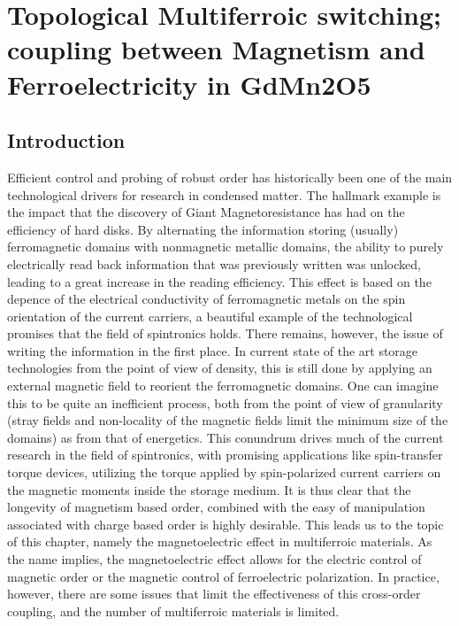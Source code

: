 \chapter{Topological Multiferroic switching; coupling between Magnetism and Ferroelectricity in GdMn2O5}
\section{Introduction}
Efficient control and probing of robust order has historically been one of the main technological drivers for research in condensed matter.
The hallmark example is the impact that the discovery of Giant Magnetoresistance has had on the efficiency of hard disks.
By alternating the information storing (usually) ferromagnetic domains with nonmagnetic metallic domains, the ability to purely electrically read back information that was previously written was unlocked, leading to a great increase in the reading efficiency.
This effect is based on the depence of the electrical conductivity of ferromagnetic metals on the spin orientation of the current carriers, a beautiful example of the technological promises that the field of spintronics holds.
There remains, however, the issue of writing the information in the first place.
In current state of the art storage technologies from the point of view of density, this is still done by applying an external magnetic field to reorient the ferromagnetic domains. One can imagine this to be quite an inefficient process, both from the point of view of granularity (stray fields and non-locality of the magnetic fields limit the minimum size of the domains) as from that of energetics.
This conundrum drives much of the current research in the field of spintronics, with promising applications like spin-transfer torque devices, utilizing the torque applied by spin-polarized current carriers on the magnetic moments inside the storage medium.
It is thus clear that the longevity of magnetism based order, combined with the easy of manipulation associated with charge based order is highly desirable.
This leads us to the topic of this chapter, namely the magnetoelectric effect in multiferroic materials.
As the name implies, the magnetoelectric effect allows for the electric control of magnetic order or the magnetic control of ferroelectric polarization\cite{Spaldin2019,Khomskii2009,Fiebig2005,Fiebig2016,Cheong2007}.
In practice, however, there are some issues that limit the effectiveness of this cross-order coupling, and the number of multiferroic materials is limited.
